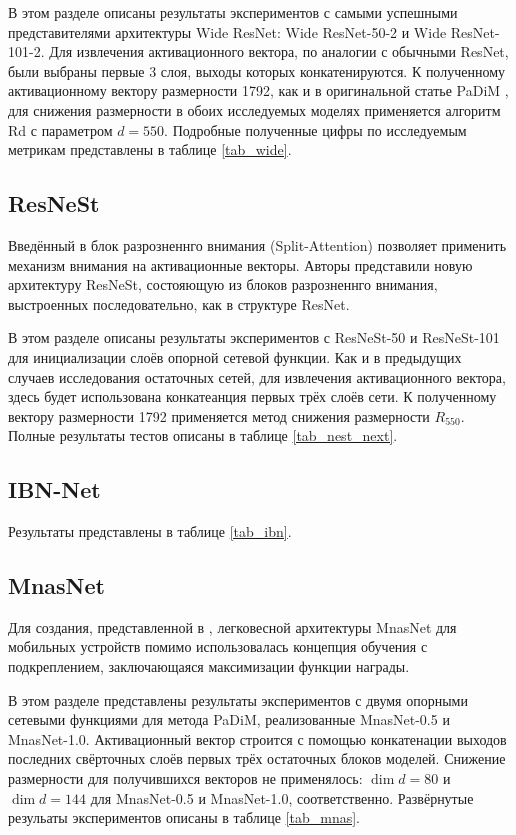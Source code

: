 \documentclass{article}
\begin{document}
\begin{large}
В этом разделе описаны результаты экспериментов с самыми успешными представителями архитектуры Wide ResNet: Wide ResNet-50-2 и Wide ResNet-101-2. Для извлечения активационного вектора, по аналогии с обычными ResNet, были выбраны первые 3 слоя, выходы которых конкатенируются. К полученному активационному вектору размерности 1792, как и в оригинальной статье PaDiM \cite{padim}, для снижения размерности в обоих исследуемых моделях применяется алгоритм Rd с параметром $d = 550$. Подробные полученные цифры по исследуемым метрикам представлены в таблице \ref{tab_wide}.

\subsection{ResNeSt}

Введённый в \cite{resnest} блок разрозненнго внимания (Split-Attention) позволяет применить механизм внимания на активационные векторы. Авторы \cite{resnest} представили новую архитектуру ResNeSt, состояющую из блоков разрозненнго внимания, выстроенных последовательно, как в структуре ResNet.

В этом разделе описаны результаты экспериментов с ResNeSt-50 и ResNeSt-101 для инициализации слоёв опорной сетевой функции. Как и в предыдущих случаев исследования остаточных сетей, для извлечения активационного вектора, здесь будет использована конкатеанция первых трёх слоёв сети. К полученному вектору размерности 1792 применяется метод снижения размерности $R_550$. Полные результаты тестов описаны в таблице \ref{tab_nest_next}.

\subsection{IBN-Net}

\cite{ibn}

Результаты представлены в таблице \ref{tab_ibn}.


\subsection{MnasNet}

Для создания, представленной в \cite{mnas}, легковесной архитектуры MnasNet для мобильных устройств помимо  использовалась концепция обучения с подкреплением, заключающаяся максимизации функции награды.

В этом разделе представлены результаты экспериментов с двумя опорными сетевыми функциями для метода PaDiM, реализованные MnasNet-0.5 и MnasNet-1.0. Активационный вектор строится с помощью конкатенации выходов последних свёрточных слоёв первых трёх остаточных блоков моделей. Снижение размерности для получившихся векторов не применялось: $\dim d = 80$ и $\dim d = 144$ для MnasNet-0.5 и MnasNet-1.0, соответственно. Развёрнутые резульаты экспериментов описаны в таблице \ref{tab_mnas}.


\end{large}
\end{document}
